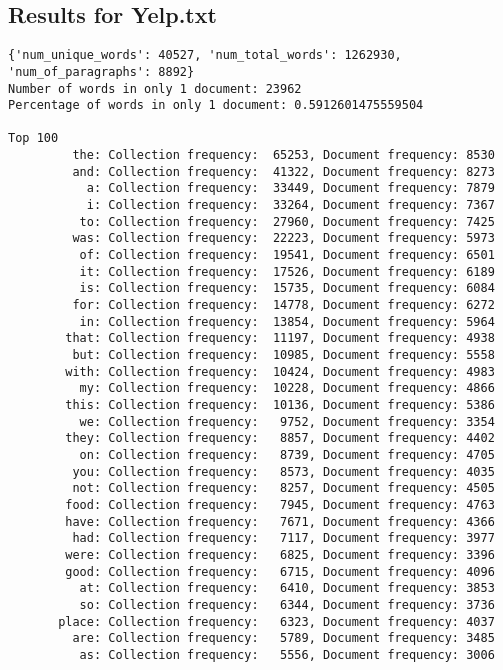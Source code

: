 \documentclass{article}
\begin{document}
\subsection{Results for Yelp.txt}
\begin{verbatim}
{'num_unique_words': 40527, 'num_total_words': 1262930, 
'num_of_paragraphs': 8892}
Number of words in only 1 document: 23962
Percentage of words in only 1 document: 0.5912601475559504

Top 100
         the: Collection frequency:  65253, Document frequency: 8530
         and: Collection frequency:  41322, Document frequency: 8273
           a: Collection frequency:  33449, Document frequency: 7879
           i: Collection frequency:  33264, Document frequency: 7367
          to: Collection frequency:  27960, Document frequency: 7425
         was: Collection frequency:  22223, Document frequency: 5973
          of: Collection frequency:  19541, Document frequency: 6501
          it: Collection frequency:  17526, Document frequency: 6189
          is: Collection frequency:  15735, Document frequency: 6084
         for: Collection frequency:  14778, Document frequency: 6272
          in: Collection frequency:  13854, Document frequency: 5964
        that: Collection frequency:  11197, Document frequency: 4938
         but: Collection frequency:  10985, Document frequency: 5558
        with: Collection frequency:  10424, Document frequency: 4983
          my: Collection frequency:  10228, Document frequency: 4866
        this: Collection frequency:  10136, Document frequency: 5386
          we: Collection frequency:   9752, Document frequency: 3354
        they: Collection frequency:   8857, Document frequency: 4402
          on: Collection frequency:   8739, Document frequency: 4705
         you: Collection frequency:   8573, Document frequency: 4035
         not: Collection frequency:   8257, Document frequency: 4505
        food: Collection frequency:   7945, Document frequency: 4763
        have: Collection frequency:   7671, Document frequency: 4366
         had: Collection frequency:   7117, Document frequency: 3977
        were: Collection frequency:   6825, Document frequency: 3396
        good: Collection frequency:   6715, Document frequency: 4096
          at: Collection frequency:   6410, Document frequency: 3853
          so: Collection frequency:   6344, Document frequency: 3736
       place: Collection frequency:   6323, Document frequency: 4037
         are: Collection frequency:   5789, Document frequency: 3485
          as: Collection frequency:   5556, Document frequency: 3006

\end{verbatim}
\end{document}
